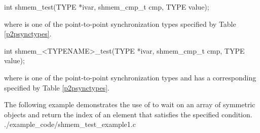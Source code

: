 
\begin{apidefinition}

\begin{C11synopsis}
int shmem_test(TYPE *ivar, shmem_cmp_t cmp, TYPE value);
\end{C11synopsis}
where \TYPE{} is one of the point-to-point synchronization types specified by
Table \ref{p2psynctypes}.

\begin{Csynopsis}
int shmem_<TYPENAME>_test(TYPE *ivar, shmem_cmp_t cmp, TYPE value);
\end{Csynopsis}
where \TYPE{} is one of the point-to-point synchronization types and has a
corresponding \TYPENAME{} specified by Table \ref{p2psynctypes}.

\begin{apiarguments}


\end{apiarguments}




\begin{apiexamples}
  \apicexample
      {The following  example demonstrates the use of  to
        wait on an array of symmetric objects and return the index of an
        element that satisfies the specified condition.}
      {./example_code/shmem_test_example1.c}
      {}
\end{apiexamples}

\end{apidefinition}
